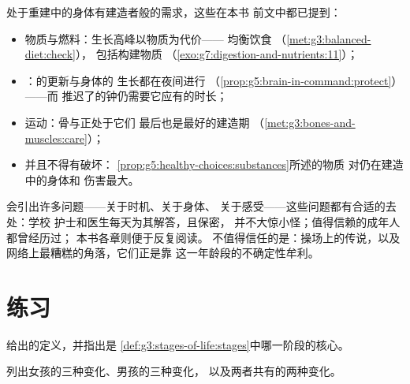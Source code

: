 \begin{proposition}[重建期间的照护]\label{prop:g8:puberty:care}
处于重建中的身体有建造者般的需求，这些在本书
前文中都已提到：
\begin{itemize}
  \item 物质与燃料：生长高峰以物质为代价——
        均衡饮食
        （\cref{met:g3:balanced-diet:check}），
        包括构建物质
        （\cref{exo:g7:digestion-and-nutrients:11}）；
  \item {}：的更新与身体的
        生长都在夜间进行
        （\cref{prop:g5:brain-in-command:protect}）——而
        推迟了的钟仍需要它应有的时长；
  \item 运动：骨与正处于它们
        最后也是最好的建造期
        （\cref{met:g3:bones-and-muscles:care}）；
  \item 并且不得有破坏：
        \cref{prop:g5:healthy-choices:substances}所述的物质
        对仍在建造中的身体和
        伤害最大。
\end{itemize}
\end{proposition}
\admitted

\begin{example}[问题有去处]\label{ex:g8:puberty:questions}
会引出许多问题——关于时机、关于身体、
关于感受——这些问题都有合适的去处：学校
护士和医生每天为其解答，且保密，
并不大惊小怪；值得信赖的成年人都曾经历过；
本书各章则便于反复阅读。
不值得信任的是：操场上的传说，以及
网络上最糟糕的角落，它们正是靠
这一年龄段的不确定性牟利。
\end{example}

\section{练习}

\begin{exercise}[$\star$]\label{exo:g8:puberty:1}
给出的定义，并指出是
\cref{def:g3:stages-of-life:stages}中哪一阶段的核心。
\end{exercise}

\begin{exercise}[$\star$]\label{exo:g8:puberty:2}
列出女孩的三种变化、男孩的三种变化，
以及两者共有的两种变化。
\end{exercise}

